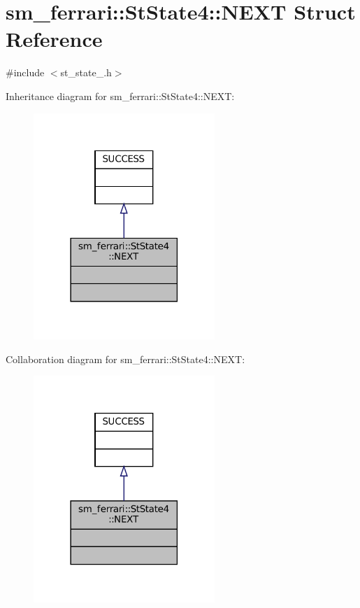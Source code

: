 \hypertarget{structsm__ferrari_1_1StState4_1_1NEXT}{}\section{sm\+\_\+ferrari\+:\+:St\+State4\+:\+:N\+E\+XT Struct Reference}
\label{structsm__ferrari_1_1StState4_1_1NEXT}


{\ttfamily \#include $<$st\+\_\+state\+\_.\+h$>$}



Inheritance diagram for sm\+\_\+ferrari\+:\+:St\+State4\+:\+:N\+E\+XT\+:
\nopagebreak
\begin{figure}[H]
\begin{center}
\leavevmode
\includegraphics[width=194pt]{structsm__ferrari_1_1StState4_1_1NEXT__inherit__graph}
\end{center}
\end{figure}


Collaboration diagram for sm\+\_\+ferrari\+:\+:St\+State4\+:\+:N\+E\+XT\+:
\nopagebreak
\begin{figure}[H]
\begin{center}
\leavevmode
\includegraphics[width=194pt]{structsm__ferrari_1_1StState4_1_1NEXT__coll__graph}
\end{center}
\end{figure}


